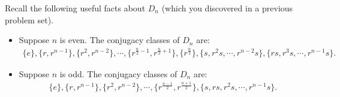 \documentclass{cos324}
\begin{document}
Recall the following useful facts about $D_{n}$ (which you discovered in a previous problem set).
\begin{itemize}
    \item Suppose $n$ is even. The conjugacy classes of $D_{n}$ are:
    \begin{align*}
        \{e\},  \{r,r^{n-1}\},  \{r^{2},r^{n-2}\},  \cdots ,  \{r^{\frac{n}{2}-1},r^{\frac{n}{2}+1}\}, \{r^{\frac{n}{2}}\}, \{s,r^{2}s,\cdots,r^{n-2}s\}, \{rs,r^{3}s,\cdots,r^{n-1}s\}.
    \end{align*}
    \item Suppose $n$ is odd. The conjugacy classes of $D_{n}$ are:
    \begin{align*}
        \{e\},  \{r,r^{n-1}\},  \{r^{2},r^{n-2}\},  \cdots , \{r^{\frac{n-1}{2}},r^{\frac{n+1}{2}}\},  \{s,rs,r^{2}s,\cdots,r^{n-1}s\}.
    \end{align*}
\end{itemize}






\end{document}
